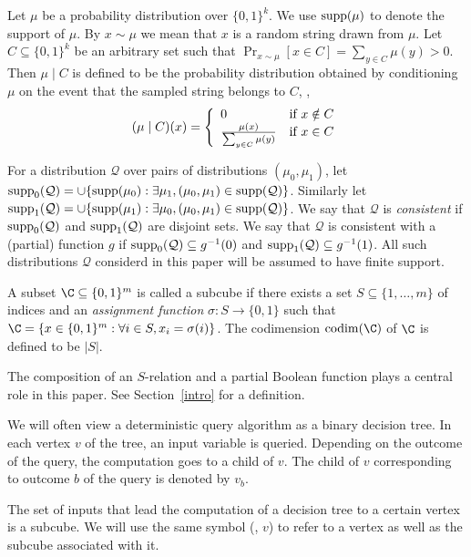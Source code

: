 \documentclass{toc}
\newcommand{\arelation}{an $S$-relation\xspace} %
\newcommand{\codim}{\mathrm{codim}}
\newcommand\supp{\mathop{\rm supp}}
\newcommand{\clQ}{\mathcal{Q}}
\begin{document}
Let $\mu$ be a probability distribution over $\{0,1\}^k$. We use $\supp(\mu)$ to denote the support of $\mu$.  By $x \sim \mu$ we mean that $x$ is a random string drawn from $\mu$. Let $C \subseteq \{0,1\}^k$ be an arbitrary set 
such that $\Pr_{x \sim \mu}[x \in C]= \sum_{y \in C} \mu(y) > 0$. Then $\mu \mid C$ is defined to be the probability distribution obtained by conditioning $\mu$ on the event that the sampled string belongs to $C$, \ie,
\[
(\mu \mid C)(x)=\left\{  \begin{array}{ll} $0$ & \mbox{if $x \notin C$} \\
\frac{\mu(x)}{\sum_{y \in C} \mu(y)} & \mbox{if $x \in C$}\end{array}   \right.
\]

For a distribution $\clQ$ over pairs of distributions $(\mu_0, \mu_1)$, let $\supp_0(\clQ) = \cup \{ \supp(\mu_0) : \exists \mu_1, (\mu_0, \mu_1) \in \supp(\clQ)\}$.  Similarly let 
$\supp_1(\clQ) = \cup \{ \supp(\mu_1) : \exists \mu_0, (\mu_0, \mu_1) \in \supp(\clQ)\}$.  We say that $\clQ$ is \emph{consistent} if $\supp_0(\clQ)$ and $\supp_1(\clQ)$ are disjoint 
sets.  We say that $\clQ$ is consistent with a (partial) function $g$ if $\supp_0(\clQ) \subseteq g^{-1}(0)$ and $\supp_1(\clQ) \subseteq g^{-1}(1)$. All such distributions $\clQ$ considerd in this paper will be assumed to have finite support. 

%
\begin{definition}
A subset $\C \subseteq \{0,1\}^m$ is called a
subcube if there exists a set $S \subseteq \{1, \ldots, m\}$ of indices and an \emph{assignment function} $\sigma:S \rightarrow \{0,1\}$ such that $\C=\{x \in \{0,1\}^m:\forall i \in S, x_i=\sigma(i)\}$. The 
codimension $\codim(\C)$ of $\C$ is defined to be $|S|$. 
\end{definition}
%
%
The composition of \arelation and a partial Boolean function plays a central role in this paper. See Section~\ref{intro} for a definition.

We will often view a deterministic query algorithm as a binary decision tree. In each vertex $v$ of the tree, an input variable is queried. Depending on the outcome of the query, the computation goes to a child of $v$. The child of $v$ corresponding to outcome $b$ of the query is denoted by $v_b$.

The set of inputs that lead the computation of a decision tree to a certain vertex is a subcube. We will use the same symbol (\eg, $v$) to refer to a vertex as well as the subcube associated with it.
\end{document}
